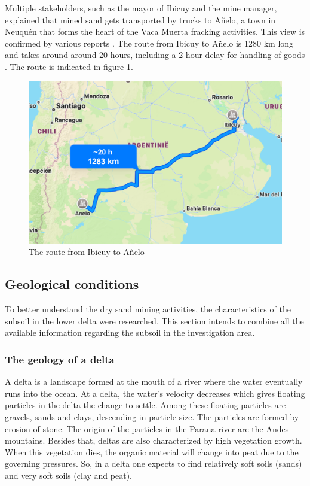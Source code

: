 Multiple stakeholders, such as the mayor of Ibicuy and the mine manager, explained that mined sand gets transported by trucks to Añelo, a town in Neuquén that forms the heart of the Vaca Muerta fracking activities. This view is confirmed by various reports \autocite{cauceArenasParaFracking2022} \autocite{secretariadepoliticamineraArenasParaFracking2019}. The route from Ibicuy to Añelo is 1280 km long and takes around around 20 hours, including a 2 hour delay for handling of goods \autocite{secretariadepoliticamineraArenasParaFracking2019}. The route is indicated in figure \ref{fig:sandroute}. 

\begin{figure}[H]
    \centering
    \includegraphics[width=0.6\linewidth]{figures/ch9/Routesand.png}
    \caption{The route from Ibicuy to Añelo}
    \label{fig:sandroute}
\end{figure}

\subsection{Geological conditions}
To better understand the dry sand mining activities, the characteristics of the subsoil in the lower delta were researched. This section intends to combine all the available information regarding the subsoil in the investigation area.

\subsubsection{The geology of a delta}
A delta is a landscape formed at the mouth of a river where the water eventually runs into the ocean. At a delta, the water's velocity decreases which gives floating particles in the delta the change to settle. Among these floating particles are gravels, sands and clays, descending in particle size. The particles are formed by erosion of stone. The origin of the particles in the Parana river are the Andes mountains. 
Besides that, deltas are also characterized by high vegetation growth. When this vegetation dies, the organic material will change into peat due to the governing pressures. So, in a delta one expects to find relatively soft soils (sands) and very soft soils (clay and peat).

